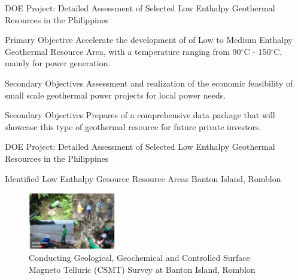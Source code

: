 \begin{frame}{DOE Project: Detailed Assessment of Selected Low Enthalpy Geothermal
Resources in the Philippines\cite{halcon2015detailed}}
    \begin{alertblock}{Primary Objective}
        Accelerate the development of  of Low to Medium
        Enthalpy Geothermal Resource Area, with a temperature ranging from 90$^{\circ}$C - 150$^{\circ}$C, mainly for power generation.
    \end{alertblock}
    \begin{block}{Secondary Objectives}
         Assessment and realization of the economic feasibility of small scale geothermal power projects for local power needs.
    \end{block}
    \begin{block}{Secondary Objectives}
        Prepares of a comprehensive data package that will showcase this type of geothermal resource for future private investors.
    \end{block}
\end{frame}

\begin{frame}{DOE Project: Detailed Assessment of Selected Low Enthalpy Geothermal
Resources in the Philippines\cite{halcon2015detailed}}
    \begin{block}{Identified Low Enthalpy Gesource Resource Areas}
        Banton Island, Romblon
    \end{block}
    \begin{figure}
        \centering
        \includegraphics[height=2.5cm]{images/DOEbontonisland.PNG}
        \caption{\centering Conducting Geological, Geochemical and Controlled Surface Magneto Telluric (CSMT) Survey at Banton Island, Romblon}
    \end{figure}
\end{frame}


